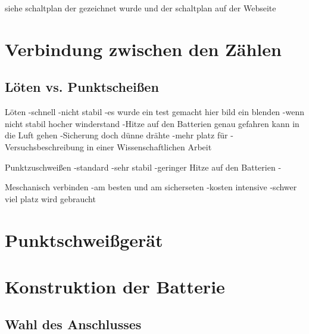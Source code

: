 siehe schaltplan der gezeichnet wurde
und der schaltplan auf der Webseite


\section{Verbindung zwischen den Zählen}


\subsection{Löten vs. Punktscheißen}
Löten 
-schnell
-nicht stabil
-es wurde ein test gemacht hier bild ein blenden
-wenn nicht stabil hocher winderstand
-Hitze auf den Batterien genau gefahren kann in die Luft gehen
-Sicherung doch dünne drähte
-mehr platz für 
-Versuchsbeschreibung in einer Wissenschaftlichen Arbeit

Punktzuschweißen
-standard
-sehr stabil
-geringer Hitze auf den Batterien
-

Meschanisch verbinden
-am besten und am sicherseten
-kosten intensive
-schwer viel platz wird gebraucht
\section{Punktschweißgerät}









\section{Konstruktion der Batterie}

\subsection{Wahl des Anschlusses}
